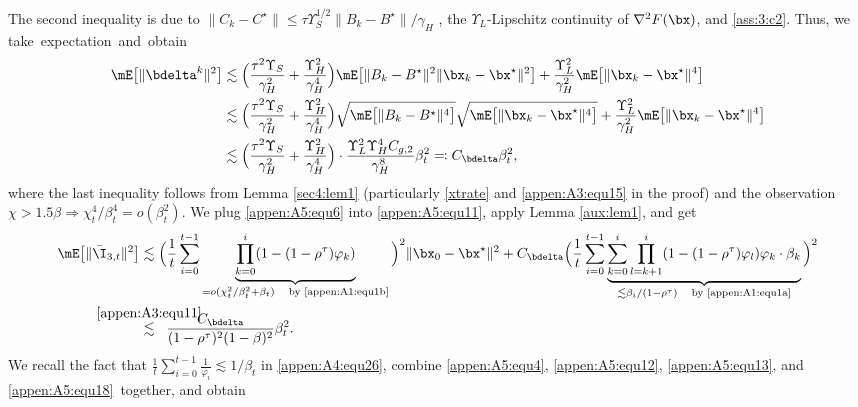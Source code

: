 The second inequality is due to $\|C_k-C^\star\|\leq \tau\Upsilon_{S}^{1/2}\|B_k-B^\star\|/\gamma_H$ \cite[Lemma 5.2]{Na2022Statistical}, the $\Upsilon_L$-Lipschitz continuity of $\nabla^2 F(\bx)$, and \eqref{ass:3:c2}. Thus, we take~expectation~and~obtain
\begin{align}\label{appen:A5:equ6}
\mE\big[\|\bdelta^k\|^2\big] &\lesssim \Big(\frac{\tau^2\Upsilon_{S}}{\gamma_H^2} +\frac{\Upsilon_H^2}{\gamma_H^4}\Big) \mE\big[\|B_k-B^\star\|^2\|\bx_k-\bx^\star\|^2\big] + \frac{\Upsilon_L^2}{\gamma_H^2}\mE\big[\|\bx_k-\bx^\star\|^4\big]\nonumber\\
&\lesssim \Big(\frac{\tau^2\Upsilon_{S}}{\gamma_H^2}+\frac{\Upsilon_H^2}{\gamma_H^4}\Big)\sqrt{\mE\big[\|B_k-B^\star\|^4\big]}\sqrt{\mE\big[\|\bx_k-\bx^\star\|^4\big]} +\frac{\Upsilon_L^2}{\gamma_H^2} 
\mE\big[\|\bx_k-\bx^\star\|^4\big]\nonumber\\
&\lesssim \Big(\frac{\tau^2\Upsilon_S}{\gamma_H^2}+\frac{\Upsilon_H^2}{\gamma_H^4}\Big)\cdot \frac{\Upsilon_L^2\Upsilon_H^4C_{g,2}}{\gamma_H^8}\beta_t^2 \eqqcolon C_{\bdelta}\beta_t^2,
\end{align}
where the last inequality follows from Lemma \ref{sec4:lem1} (particularly \eqref{xtrate} and \eqref{appen:A3:equ15} in the proof) and the observation $\chi>1.5\beta \Rightarrow \chi_t^4/\beta_t^4 = o(\beta_t^2)$. We plug \eqref{appen:A5:equ6} into \eqref{appen:A5:equ11}, apply Lemma \ref{aux:lem1}, and get
\begin{align}\label{appen:A5:equ18}
\mE\big[\|\bar{\I}_{3,t}\|^2\big]&\lesssim \Big(\frac{1}{t}\sum_{i=0}^{t-1}\underbrace{\prod_{k=0}^i(1-(1-\rho^\tau)\varphi_k)}_{=o(\chi_t^2/\beta_t^2+\beta_t)\quad\text{by \eqref{appen:A1:equ1b}}}\Big)^2\|\bx_0-\bx^\star\|^2 + C_{\bdelta}\Big(\frac{1}{t}\sum_{i=0}^{t-1}\underbrace{\sum_{k=0}^i\prod_{l=k+1}^i(1-(1-\rho^\tau)\varphi_l)\varphi_k\cdot \beta_k}_{\lesssim \beta_i/(1-\rho^\tau)\quad\text{by \eqref{appen:A1:equ1a}}}\Big)^2\nonumber\\
&\stackrel{\mathclap{\eqref{appen:A3:equ11}}}{\lesssim}\;\; \frac{C_{\bdelta}}{(1-\rho^\tau)^2(1-\beta)^2}\beta_t^2.
\end{align}
We recall the fact that $\frac{1}{t}\sum_{i=0}^{t-1}\frac{1}{\varphi_i}\lesssim 1/\beta_t$ in \eqref{appen:A4:equ26},  combine \eqref{appen:A5:equ4},  \eqref{appen:A5:equ12}, \eqref{appen:A5:equ13}, and \eqref{appen:A5:equ18}~together, and obtain
